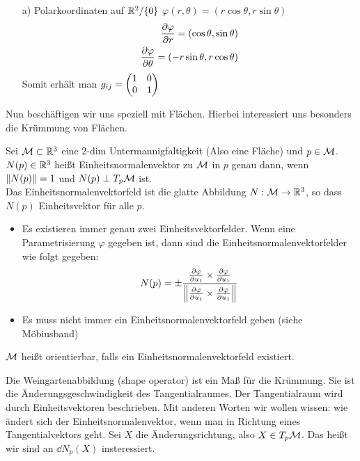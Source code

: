\begin{bsp}
\begin{itemize}
    \item[a)] Polarkoordinaten auf $\mathbb{R}^2 / \{ 0 \}$ $\varphi (r , \theta) = (r \cos \theta , r \sin \theta)$
    \begin{align*}
        \pdv{\varphi}{r} = ( \cos \theta , \sin \theta) \\
        \pdv{\varphi}{\theta} = (-r \sin \theta , r \cos \theta)
    \end{align*}
    Somit erhält man $g_{ij} = \mqty(1 & 0 \\ 0 & 1) $
\end{itemize}
\end{bsp}
Nun beschäftigen wir uns speziell mit Flächen.
Hierbei interessiert uns besonders die Krümmung von Flächen.
\begin{defs}[Einheitsnormalenvektorfeld]
Sei $\mathcal{M} \subset \mathbb{R}^3$ eine $2$-dim Untermannigfaltigkeit (Also eine Fläche)
und $p\in\mathcal{M}$.
$N(p)\in\mathbb{R}^3$ heißt Einheitsnormalenvektor zu $\mathcal{M}$ in $p$ genau dann, wenn 
$\norm{N(p)}=1$ und $N(p) \perp T_p\mathcal{M}$ ist.\\
Das Einheitsnormalenvektorfeld ist die glatte Abbildung $N : \mathcal{M} \to \mathbb{R}^3$, so dass $N(p)$ Einheitsvektor für alle $p$.
\end{defs}
\begin{bem}
\begin{itemize}
    \item Es existieren immer genau zwei Einheitsvektorfelder. Wenn eine Parametrisierung $\varphi$ gegeben ist,
        dann sind die Einheitsnormalenvektorfelder wie folgt gegeben:
        \begin{align}
            N(p) = \pm \frac{\pdv{\varphi}{u_1} \times \pdv{\varphi}{u_1}}{\norm{\pdv{\varphi}{u_1} \times \pdv{\varphi}{u_1}}} 
        \end{align}
    \item Es muss nicht immer ein Einheitsnormalenvektorfeld geben (siehe Möbiusband)
\end{itemize}
\end{bem}


\begin{defs}
    $\mathcal{M}$ heißt orientierbar, falls ein Einheitsnormalenvektorfeld existiert.
\end{defs}

Die Weingartenabbildung (shape operator) ist ein Maß für die Krümmung.
Sie ist die Änderungsgeschwindigkeit des Tangentialraumes.
Der Tangentialraum wird durch Einheitsvektoren beschrieben.
Mit anderen Worten wir wollen wissen:
wie ändert sich der Einheitsnormalenvektor, wenn man in Richtung eines Tangentialvektors geht.
Sei $X$ die Änderungsrichtung, also $X \in T_p\mathcal{M}$.
Das heißt wir sind an $\dd N_p(X)$ insteressiert.

